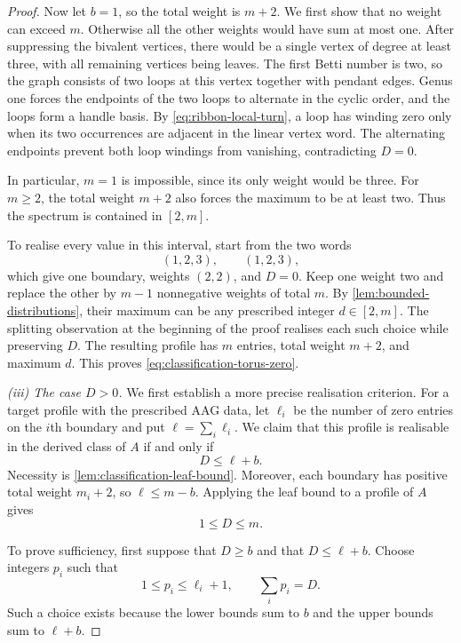\documentclass[11pt]{amsart}
\theoremstyle{definition}
\theoremstyle{plain}
\theoremstyle{definition}
\theoremstyle{definition}
\begin{document}
\begin{proof}
Now let $b=1$, so the total weight is $m+2$.
We first show that no weight can exceed $m$.
Otherwise all the other weights would have sum
at most one.
After suppressing the bivalent vertices, there would
be a single vertex of degree at least three, with
all remaining vertices being leaves.
The first Betti number is two, so the graph consists
of two loops at this vertex together with pendant
edges.
Genus one forces the endpoints of the two loops to
alternate in the cyclic order, and the loops form
a handle basis.
By \eqref{eq:ribbon-local-turn}, a loop has winding
zero only when its two occurrences are adjacent
in the linear vertex word.
The alternating endpoints prevent both loop windings
from vanishing, contradicting $D=0$.

In particular, $m=1$ is impossible, since its only
weight would be three.
For $m\geq2$, the total weight $m+2$ also forces the
maximum to be at least two.
Thus the spectrum is contained in $[2,m]$.

To realise every value in this interval, start from
the two words
\[
 (1,2,3),\qquad(1,2,3),
\]
which give one boundary, weights $(2,2)$, and $D=0$.
Keep one weight two and replace the other by $m-1$
nonnegative weights of total $m$.
By \cref{lem:bounded-distributions}, their maximum
can be any prescribed integer $d\in[2,m]$.
The splitting observation at the beginning of the
proof realises each such choice while preserving $D$.
The resulting profile has $m$ entries, total weight
$m+2$, and maximum $d$.
This proves \eqref{eq:classification-torus-zero}.

\smallskip
\noindent\emph{(iii) The case $D>0$.}
We first establish a more precise realisation criterion.
For a target profile with the prescribed AAG data,
let $\ell_i$ be the number of zero entries on the
$i$th boundary and put $\ell=\sum_i\ell_i$.
We claim that this profile is realisable in the
derived class of $A$ if and only if
\[
 D\leq\ell+b.
\]
Necessity is \cref{lem:classification-leaf-bound}.
Moreover, each boundary has positive total weight
$m_i+2$, so $\ell\leq m-b$.
Applying the leaf bound to a profile of $A$ gives
\[
 1\leq D\leq m.
\]

To prove sufficiency, first suppose that $D\geq b$
and that $D\leq\ell+b$.
Choose integers $p_i$ such that
\begin{equation}
\label{eq:classification-necklace-choice}
 1\leq p_i\leq\ell_i+1,
 \qquad
 \sum_i p_i=D.
\end{equation}
Such a choice exists because the lower bounds sum
to $b$ and the upper bounds sum to $\ell+b$.


\end{proof}
\end{document}
